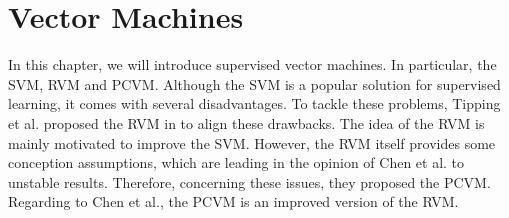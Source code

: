 \chapter{Vector Machines}\label{Pc}
In this chapter, we will introduce supervised vector machines.
In particular, the \ac{SVM}, \ac{RVM} and \ac{PCVM}.
Although the \acs{SVM} is a popular solution for supervised learning, it comes with several disadvantages.\cite{Chen.2009}
To tackle these problems, Tipping et al. proposed the \acs{RVM} in \cite{Tipping.2001} to align these drawbacks.
The idea of the \acs{RVM} is mainly motivated to improve the \acs{SVM}\cite[p. 1-2]{Tipping.2001}.
However, the \acs{RVM} itself provides some conception assumptions, which are leading in the opinion of Chen et al. to unstable results.
Therefore, concerning these issues, they proposed the \acs{PCVM}.
Regarding to Chen et al., the \acs{PCVM} is an improved version of the \acs{RVM}.\cite{Chen.2009}
